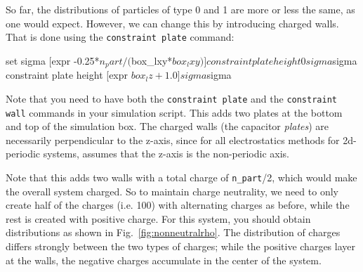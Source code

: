 \documentclass[
a4paper,                        %
11pt,                           %
twoside,                        %
footsepline,                    %
headsepline,                    %
headexclude,                    %
footexclude,                    %
pagesize,                       %
]{scrartcl}
\begin{document}
So far, the distributions of particles of type 0 and 1 are more or
less the same, as one would expect. However, we can change this by
introducing charged walls. That is done using the
\verb|constraint plate| command:

\begin{tclcode}
  set sigma [expr -0.25*$n_part/($box_lxy*$box_lxy)]
  constraint plate height 0 sigma $sigma
  constraint plate height [expr $box_lz + 1.0] sigma $sigma
\end{tclcode}

Note that you need to have both the \verb|constraint plate| and the 
\verb|constraint wall| commands in your simulation script.
This adds two plates at the bottom and top of the simulation box. The
charged walls (the capacitor \emph{plates}) are necessarily
perpendicular to the z-axis, since for all electrostatics methods for
2d-periodic systems, \es{} assumes that the z-axis is the
non-periodic axis.

Note that
this adds two walls with a total charge of \verb|n_part|/2, which
would make the overall system charged. So to maintain charge
neutrality, we need to only create half of the charges (i.e. 100)
with alternating charges as before, while the rest is created
with positive charge.
For this system, you should obtain distributions as shown in
Fig.~\ref{fig:nonneutralrho}. The distribution of charges differs
strongly between the two types of charges; while the positive charges
layer at the walls, the negative charges accumulate in the center of
the system.
\fi
\end{document}
